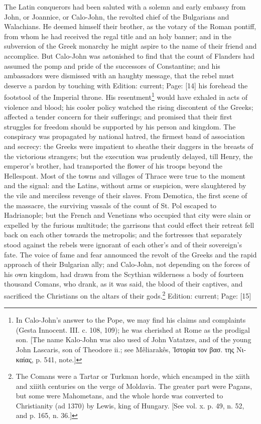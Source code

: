 The Latin conquerors had been saluted with a solemn and early embassy from John, or Joannice, or Calo-John, the revolted chief of the Bulgarians and Walachians. He deemed himself their brother, as the votary of the Roman pontiff, from whom he had received the regal title and an holy banner; and in the subversion of the Greek monarchy he might aspire to the name of their friend and accomplice. But Calo-John was astonished to find that the count of Flanders had assumed the pomp and pride of the successors of Constantine; and his ambassadors were dismissed with an haughty message, that the rebel must deserve a pardon by touching with Edition: current; Page: [14] his forehead the footstool of the Imperial throne. His resentment\footnote{In Calo-John\texthebrew{}’s answer to the Pope, we may find his claims and complaints (Gesta Innocent. III. c. 108, 109); he was cherished at Rome as the prodigal son. [The name Kalo-John was also used of John Vatatzes, and of the young John Lascaris, son of Theodore ii.; see Mêliarakês, \textgreek{\texthebrew{Ἱ}στορία τον βασ. της Νικαίας}, p. 541, note.]} would have exhaled in acts of violence and blood; his cooler policy watched the rising discontent of the Greeks; affected a tender concern for their sufferings; and promised that their first struggles for freedom should be supported by his person and kingdom. The conspiracy was propagated by national hatred, the firmest band of association and secrecy: the Greeks were impatient to sheathe their daggers in the breasts of the victorious strangers; but the execution was prudently delayed, till Henry, the emperor\texthebrew{}’s brother, had transported the flower of his troops beyond the Hellespont. Most of the towns and villages of Thrace were true to the moment and the signal: and the Latins, without arms or suspicion, were slaughtered by the vile and merciless revenge of their slaves. From Demotica, the first scene of the massacre, the surviving vassals of the count of St. Pol escaped to Hadrianople; but the French and Venetians who occupied that city were slain or expelled by the furious multitude; the garrisons that could effect their retreat fell back on each other towards the metropolis; and the fortresses that separately stood against the rebels were ignorant of each other\texthebrew{}’s and of their sovereign\texthebrew{}’s fate. The voice of fame and fear announced the revolt of the Greeks and the rapid approach of their Bulgarian ally; and Calo-John, not depending on the forces of his own kingdom, had drawn from the Scythian wilderness a body of fourteen thousand Comans, who drank, as it was said, the blood of their captives, and sacrificed the Christians on the altars of their gods.\footnote{The Comans were a Tartar or Turkman horde, which encamped in the xiith and xiiith centuries on the verge of Moldavia. The greater part were Pagans, but some were Mahometans, and the whole horde was converted to Christianity (ad 1370) by Lewis, king of Hungary. [See vol. x. p. 49, n. 52, and p. 165, n. 36.]}
Edition: current; Page: [15]

